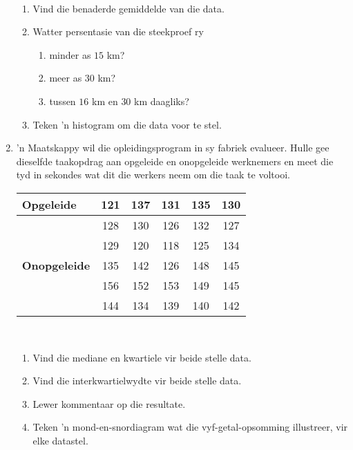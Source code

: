 \begin{eocexercises}{}
\begin{enumerate}[itemsep=6pt, label=\textbf{\arabic*}.]
\begin{center}
\begin{tabular}{|c|c|}
      \end{tabular}
    \end{center}
\vspace {8pt}\\
     \begin{enumerate}[noitemsep, label=\textbf{(\alph*)} ]
    \item Vind die benaderde gemiddelde van die data.
    \item Watter persentasie van die steekproef ry 
      \begin{enumerate}[noitemsep, label=\textbf{\roman*}. ]
      \item minder as $15$ km?
      \item meer as $30$ km?
      \item tussen $16$ km en $30$ km daagliks?
      \end{enumerate}
\item Teken 'n histogram om die data voor te stel.
    \end{enumerate}

  \item ’n Maatskappy wil die opleidingsprogram in sy fabriek evalueer. Hulle gee dieselfde taakopdrag aan opgeleide en onopgeleide werknemers en meet die tyd in sekondes wat  dit die werkers neem om die taak te voltooi. 
\\
    \begin{center}
      \begin{tabular}{|l|c|c|c|c|c|} \hline

        \textbf{Opgeleide} & 121 & 137 & 131 & 135 & 130 \\ \hline
                         & 128 & 130 & 126 & 132 & 127 \\\hline
                         & 129 & 120 & 118 & 125 & 134 \\\hline

        \textbf{Onopgeleide} & 135 & 142 & 126 & 148 & 145 \\\hline
                           & 156 & 152 & 153 & 149 & 145 \\\hline
                           & 144 & 134 & 139 & 140 & 142 \\\hline

      \end{tabular}
    \end{center}
\vspace {8pt}\\
    \begin{enumerate}[noitemsep, label=\textbf{(\alph*)} ]
    \item Vind die mediane en kwartiele vir beide stelle data.
    \item Vind die interkwartielwydte vir beide stelle data.
    \item Lewer kommentaar op die resultate.
\item Teken 'n mond-en-snordiagram wat die vyf-getal-opsomming illustreer, vir elke datastel.
    \end{enumerate}


\end{enumerate}
\end{eocexercises}
